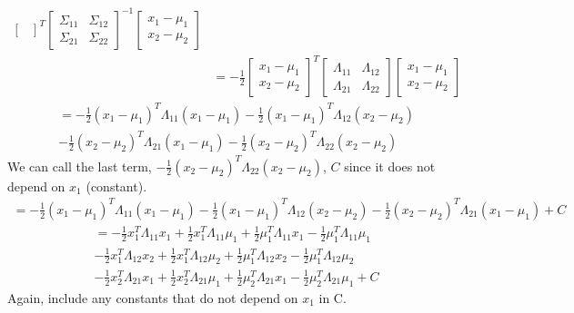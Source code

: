 \documentclass{article}
\begin{document}
\begin{enumerate}[label=(\alph*)]
\begin{align*}
\begin{bmatrix}
\end{bmatrix}
^T
\begin{bmatrix}
  \Sigma_{11} & \Sigma_{12} \\ \Sigma_{21} & \Sigma_{22}
\end{bmatrix}
^{-1}
\begin{bmatrix}
  x_1 - \mu_1 \\ x_2 - \mu_2
\end{bmatrix} \\
&=-\frac{1}{2}
\begin{bmatrix}
  x_1 - \mu_1 \\ x_2 - \mu_2
\end{bmatrix}
^T
\begin{bmatrix}
  \Lambda_{11} & \Lambda_{12} \\ \Lambda_{21} & \Lambda_{22}
\end{bmatrix}
\begin{bmatrix}
  x_1 - \mu_1 \\ x_2 - \mu_2
\end{bmatrix}
\end{align*}
\begin{multline*}
=-\frac{1}{2}(x_1-\mu_1)^T\Lambda_{11}(x_1-\mu_1)
-\frac{1}{2}(x_1-\mu_1)^T\Lambda_{12}(x_2-\mu_2) \\
-\frac{1}{2}(x_2-\mu_2)^T\Lambda_{21}(x_1-\mu_1) 
-\frac{1}{2}(x_2-\mu_2)^T\Lambda_{22}(x_2-\mu_2)
\end{multline*}
We can call the last term, $-\frac{1}{2}(x_2-\mu_2)^T\Lambda_{22}(x_2-\mu_2)$, $C$ since it does not depend on $x_1$ (constant).
\begin{multline*}
=-\frac{1}{2}(x_1-\mu_1)^T\Lambda_{11}(x_1-\mu_1)
-\frac{1}{2}(x_1-\mu_1)^T\Lambda_{12}(x_2-\mu_2)
-\frac{1}{2}(x_2-\mu_2)^T\Lambda_{21}(x_1-\mu_1) +C
\end{multline*}
\begin{multline*}
=-\frac{1}{2}x_1^T\Lambda_{11}x_1
+\frac{1}{2}x_1^T\Lambda_{11}\mu_1
+\frac{1}{2}\mu_1^T\Lambda_{11}x_1
-\frac{1}{2}\mu_1^T\Lambda_{11}\mu_1 \\
-\frac{1}{2}x_1^T\Lambda_{12}x_2
+\frac{1}{2}x_1^T\Lambda_{12}\mu_2
+\frac{1}{2}\mu_1^T\Lambda_{12}x_2
-\frac{1}{2}\mu_1^T\Lambda_{12}\mu_2 \\
-\frac{1}{2}x_2^T\Lambda_{21}x_1
+\frac{1}{2}x_2^T\Lambda_{21}\mu_1
+\frac{1}{2}\mu_2^T\Lambda_{21}x_1
-\frac{1}{2}\mu_2^T\Lambda_{21}\mu_1+C
\end{multline*}
Again, include any constants that do not depend on $x_1$ in C.
\begin{multline*}

\end{multline*}
\end{enumerate}
\end{document}
